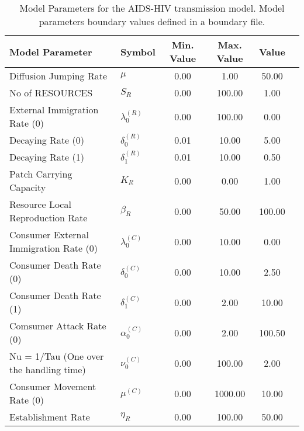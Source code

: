 \begin{table}
\centering
\begin{tabular}{p{5cm}lcccc}
{\bf Model Parameter} & {\bf Symbol} & {\bf Min. Value} & {\bf Max. Value} & {\bf Value}\\
\hline\hline
Diffusion Jumping Rate & $\mu$ & 0.00 & 1.00 & 50.00\\
No of RESOURCES & $S_R$ & 0.00 & 100.00 & 1.00\\
External Immigration Rate (0) & $\lambda^{(R)}_0$ & 0.00 & 100.00 & 0.00\\
Decaying Rate (0) & $\delta^{(R)}_0$ & 0.01 & 10.00 & 5.00\\
Decaying Rate (1) & $\delta^{(R)}_1$ & 0.01 & 10.00 & 0.50\\
Patch Carrying Capacity & $K_R$ & 0.00 & 0.00 & 1.00\\
Resource Local Reproduction Rate & $\beta_R$ & 0.00 & 50.00 & 100.00\\
Consumer External Immigration Rate (0) & $\lambda^{(C)}_0$ & 0.00 & 10.00 & 0.00\\
Consumer Death Rate (0) & $\delta^{(C)}_0$ & 0.00 & 10.00 & 2.50\\
Consumer Death Rate (1) & $\delta^{(C)}_1$ & 0.00 & 2.00 & 10.00\\
Comsumer Attack Rate (0) & $\alpha^{(C)}_0$ & 0.00 & 2.00 & 100.50\\
Nu = 1/Tau (One over the handling time) & $\nu^{(C)}_0$ & 0.00 & 100.00 & 2.00\\
Consumer Movement Rate (0) & $\mu^{(C)}$ & 0.00 & 1000.00 & 10.00\\
Establishment Rate & $\eta_R$ & 0.00 & 100.00 & 50.00\\
\hline\hline
\end{tabular}
\caption{Model Parameters for the AIDS-HIV transmission model. Model parameters boundary values defined in a boundary file.}
\end{table}
